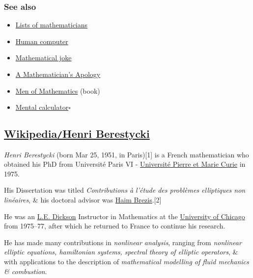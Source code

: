 \documentclass{article}
\begin{document}
\subsubsection{See also}
\begin{itemize}
	\item \href{https://en.wikipedia.org/wiki/Lists_of_mathematicians}{Lists of mathematicians}
	\item \href{https://en.wikipedia.org/wiki/Human_computer}{Human computer}
	\item \href{https://en.wikipedia.org/wiki/Mathematical_joke}{Mathematical joke}
	\item \href{https://en.wikipedia.org/wiki/A_Mathematician's_Apology}{A Mathematician's Apology}
	\item \href{https://en.wikipedia.org/wiki/Men_of_Mathematics}{Men of Mathematics} (book)
	\item \href{https://en.wikipedia.org/wiki/Mental_calculator}{Mental calculator}\hfill$\square$
\end{itemize}


\subsection{\href{https://en.wikipedia.org/wiki/Henri_Berestycki}{Wikipedia{\tt/}Henri Berestycki}}
\textit{Henri Berestycki} (born Mar 25, 1951, in Paris)[1] is a French mathematician who obtained his PhD from Université Paris VI - \href{https://en.wikipedia.org/wiki/Universit\%C3\%A9_Pierre_et_Marie_Curie}{Université Pierre et Marie Curie} in 1975.

His Dissertation was titled \textit{Contributions à l'étude des problèmes elliptiques non linéaires}, \& his doctoral advisor was \href{https://en.wikipedia.org/wiki/Haim_Brezis}{Haim Brezis}.[2]

He was an \href{https://en.wikipedia.org/wiki/Leonard_Eugene_Dickson}{L.E. Dickson} Instructor in Mathematics at the \href{https://en.wikipedia.org/wiki/University_of_Chicago}{University of Chicago} from 1975--77, after which he returned to France to continue his research.

He has made many contributions in \textit{nonlinear analysis}, ranging from \textit{nonlinear elliptic equations, hamiltonian systems, spectral theory of elliptic operators}, \& with applications to the description of \textit{mathematical modelling of fluid mechanics \& combustion}.
\end{document}

